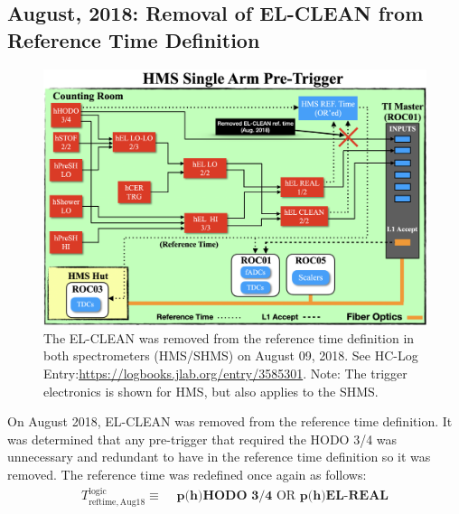 \documentclass[11pt]{article}
\begin{document}
\subsection{August, 2018: Removal of EL-CLEAN from Reference Time Definition}\label{ssec:aug2018}
\begin{figure}[H]
  \centering
  \includegraphics[scale=0.38]{images/Aug2018_trigger_change.png}
  \caption{The EL-CLEAN was removed from the reference time definition in both spectrometers (HMS/SHMS) on August 09, 2018. See HC-Log Entry:\url{https://logbooks.jlab.org/entry/3585301}. Note: The trigger
  electronics is shown for HMS, but also applies to the SHMS.}
  \label{fig:elclean_refTime_remove}
\end{figure}
On August 2018, EL-CLEAN was removed from the reference time definition. It was determined that any pre-trigger that required the HODO 3/4 was unnecessary and redundant to have in the
reference time definition so it was removed. The reference time was redefined once again as follows:
\begin{align}
  T^{\mathrm{logic}}_{\mathrm{reftime,Aug18}} \equiv &\textbf{ p(h)HODO 3/4} \text{ OR } \textbf{p(h)EL-REAL}
  \label{eq:refTime_def3}
\end{align}
\end{document}
